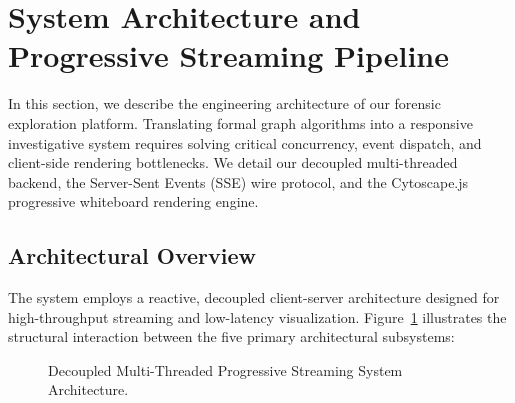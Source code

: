 \section{System Architecture and Progressive Streaming Pipeline}
\label{sec:system_architecture}

In this section, we describe the engineering architecture of our forensic exploration platform. Translating formal graph algorithms into a responsive investigative system requires solving critical concurrency, event dispatch, and client-side rendering bottlenecks. We detail our decoupled multi-threaded backend, the Server-Sent Events (SSE) wire protocol, and the Cytoscape.js progressive whiteboard rendering engine.

\subsection{Architectural Overview}

The system employs a reactive, decoupled client-server architecture designed for high-throughput streaming and low-latency visualization. Figure~\ref{fig:system_architecture} illustrates the structural interaction between the five primary architectural subsystems:

\begin{figure}[t]
\centering
\begin{minipage}{0.95\textwidth}
\centering
{}
\end{minipage}
\caption{Decoupled Multi-Threaded Progressive Streaming System Architecture.}
\label{fig:system_architecture}
\end{figure}

